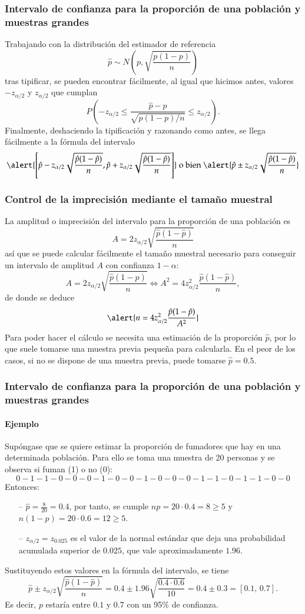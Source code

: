 \begin{frame}
\frametitle{Intervalo de confianza para la proporción de una población y muestras grandes}
Trabajando con la distribución del estimador de referencia
\[
\hat p\sim N\left(p,\sqrt{\frac{p(1-p)}{n}}\right)
\]
tras tipificar, se pueden encontrar fácilmente, al igual que hicimos antes, valores $-z_{\alpha/2}$ y $z_{\alpha/2}$
que cumplan
\[
P\left(-z_{\alpha/2}\leq \frac{\hat p-p}{\sqrt{p(1-p)/n}}\leq z_{\alpha/2} \right).
\]
Finalmente, deshaciendo la tipificación y razonando como antes, se llega fácilmente a la fórmula del intervalo
\[
\alert{\left[\hat{p}-z_{\alpha/2}\sqrt{\frac{\hat{p}(1-\hat{p})}{n}},\hat{p}+z_{\alpha/2}\sqrt{\frac{\hat{p}(1-\hat{p})}{n}}\right]}
\mbox{ o bien } 
\alert{\hat{p}\pm z_{\alpha/2}\sqrt{\frac{\hat{p}(1-\hat{p})}{n}}}
\]
\end{frame}


\begin{frame}
\frametitle{Control de la imprecisión mediante el tamaño muestral}
La amplitud o imprecisión del intervalo para la proporción de una población es
\[
A= 2 z_{\alpha/2}\sqrt{\frac{\hat{p}(1-\hat{p})}{n}}
\]
así que se puede calcular fácilmente el tamaño muestral necesario para conseguir un intervalo de amplitud $A$ con confianza $1-\alpha$:
\[
A= 2 z_{\alpha/2}\sqrt{\frac{\hat{p}(1-\hat{p})}{n}} \Leftrightarrow A^2= 4 z_{\alpha/2}^2\frac{\hat{p}(1-\hat{p})}{n},
\]
de donde se deduce
\[
\alert{n= 4 z_{\alpha/2}^2\frac{\hat{p}(1-\hat{p})}{A^2}}
\]
Para poder hacer el cálculo se necesita una estimación de la proporción $\hat{p}$, por lo que suele tomarse una muestra previa pequeña para calcularla.
En el peor de los casos, si no se dispone de una muestra previa, puede tomarse $\hat{p}=0.5$. 
\end{frame}


\begin{frame}
\frametitle{Intervalo de confianza para la proporción de una población y muestras grandes}
\framesubtitle{Ejemplo}
Supóngase que se quiere estimar la proporción de fumadores que hay en una determinada población.
Para ello se toma una muestra de 20 personas y se observa si fuman (1) o no (0):
\[
0 - 1 - 1 - 0 - 0 - 0 - 1 - 0 - 0 - 1 - 0 - 0 - 0 - 1 - 1- 0 - 1 - 1 - 0 - 0
\]
Entonces:
\begin{itemize}
\item[--] $\hat p=\frac{8}{20}=0.4$, por tanto, se cumple $np=20\cdot 0.4 = 8\geq 5$ y $n(1-p)=20\cdot 0.6= 12\geq 5$.
\item[--] $z_{\alpha/2}=z_{0.025}$ es el valor de la normal estándar que deja una probabilidad acumulada superior de $0.025$, que vale aproximadamente $1.96$.
\end{itemize}
Sustituyendo estos valores en la fórmula del intervalo, se tiene
\[
\hat{p}\pm z_{\alpha/2}\sqrt{\frac{\hat{p}(1-\hat{p})}{n}} = 0.4\pm 1.96\sqrt{\frac{0.4\cdot 0.6}{10}} = 0.4\pm  0.3 = \left[0.1,\,0.7\right].
\]
Es decir, $p$ estaría entre $0.1$ y $0.7$ con un 95\% de confianza.
\end{frame}


